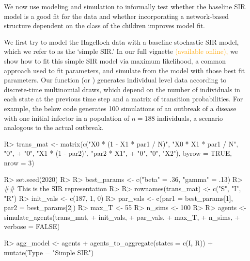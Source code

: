 \documentclass[
  shortnames]{jss}
\begin{document}
We now use modeling and simulation to informally test whether the
baseline SIR model is a good fit for the data and whether incorporating
a network-based structure dependent on the class of the children
improves model fit.

We first try to model the Hagelloch data with a baseline stochastic SIR
model, which we refer to as the `simple SIR.' In our full vignette
\textcolor{orange}{(available online),} we show how to fit this simple
SIR model via maximum likelihood, a common approach used to fit
parameters, and simulate from the model with those best fit parameters.
Our function  (or )
generates individual level data according to discrete-time multinomial
draws, which depend on the number of individuals in each state at the
previous time step and a matrix of transition probabilities. For
example, the below code generates 100 simulations of an outbreak of a
disease with one initial infector in a population of \(n= 188\)
individuals, a scenario analogous to the actual outbreak.

\begin{CodeChunk}
\begin{CodeInput}
R> trans_mat <- matrix(c("X0 * (1 - X1 * par1 / N)", "X0 * X1  * par1 / N", "0",
+                   "0", "X1 * (1 - par2)", "par2 * X1",
+                   "0", "0", "X2"), byrow = TRUE, nrow = 3)
\end{CodeInput}
\end{CodeChunk}

\begin{CodeChunk}
\begin{CodeInput}
R> set.seed(2020)
R> 
R> best_params <- c("beta" = .36, "gamma" = .13)
R> ## This is the SIR representation
R> 
R> rownames(trans_mat) <- c("S", "I", "R")
R> init_vals <- c(187, 1, 0)
R> par_vals <- c(par1 = best_params[1], par2 = best_params[2])
R> max_T <- 55
R> n_sims <- 100
R> 
R> agents <- simulate_agents(trans_mat,
+                        init_vals,
+                        par_vals,
+                        max_T,
+                        n_sims,
+                        verbose = FALSE)
\end{CodeInput}
\end{CodeChunk}

\begin{CodeChunk}
\begin{CodeInput}
R> agg_model <- agents %
+   agents_to_aggregate(states = c(I, R)) %
+   mutate(Type = "Simple SIR")
\end{CodeInput}
\end{CodeChunk}
\end{document}

